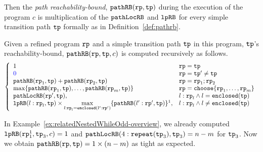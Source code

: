 Then the \emph{path reachability-bound}, $\mathtt{pathRB}(\mathtt{rp}, \mathtt{tp})$ during the execution of the program $c$ is multiplication of the $\mathtt{pathLocRB}$ and $\mathtt{lpRB}$ for every simple transition path $\mathtt{tp}$ formally as in Definition~\ref{def:pathrb}.
%
\begin{defn}
  \label{def:pathrb}
  Given a refined program $\mathtt{rp}$ and a simple transition path $\mathtt{tp}$ in this program, 
  $\mathtt{tp}$'s reachability-bound, $\mathtt{pathRB}(\mathtt{rp}, \mathtt{tp}, c)$
  is computed recursively as follows. 
{\small 
\[
  \left\{ 
  \begin{array}{ll}
    1  & \rprog = \tpath\\
    \highlight{0} & \rprog = \tpath' \neq \tpath\\
    \inoutB(\rprog_1, \tpath) + \inoutB(\rprog_2, \tpath) & \rprog = \rprog_1;\rprog_2 \\
    \max\left\{ \inoutB(\rprog_1, \tpath), \ldots, \inoutB(\rprog_m, \tpath) \right\} 
    & \rprog = \rpchoose{\rprog_1, \ldots, \rprog_m } \\
    \outinB(\rprog', \tpath), & l: \rprog_l \land l = \kw{enclosed}(\tpath) \\
    \lpchB(l:\rprog_l, \tpath )
    \times \max\limits_{l:\rprog_l = \kw{enclosed}(l':\rprog')}
   \{\inoutB(l':\rprog', \tpath)\} \footnotemark, & l: \rprog_l \land l \neq \kw{enclosed}(\tpath) \\
  \end{array}
  \right.
  \]
 }
 \end{defn}
In Example~\ref{ex:relatedNestedWhileOdd-overview}, we already computed $\mathtt{lpRB}(\mathtt{rp}_1^1, \mathtt{tp}_3, c) = 1$ and
$\mathtt{pathLocRB}(4: \mathtt{repeat}(\mathtt{tp}_3), \mathtt{tp}_3) = n - m$ for $\mathtt{tp}_3$. Now we obtain $\mathtt{pathRB}(\mathtt{rp}, \mathtt{tp}) = 1 \times (n - m)$ as tight as expected.


